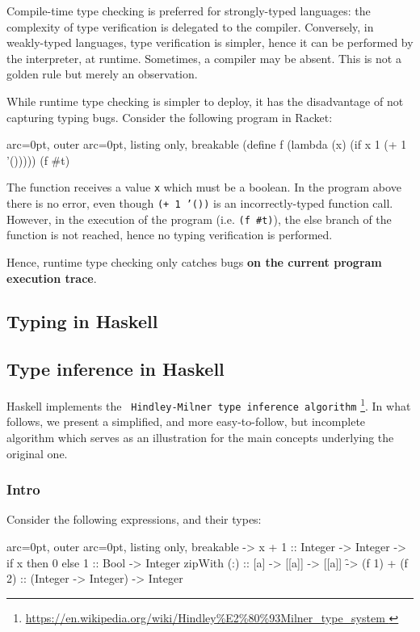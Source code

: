 Compile-time type checking is preferred for strongly-typed languages: the complexity of type verification is delegated to the compiler. Conversely, in weakly-typed languages, type verification is simpler, hence it can be performed by the interpreter, at runtime. Sometimes, a compiler may be absent. This is not a golden rule but merely an observation.

While runtime type checking is simpler to deploy, it has the disadvantage of not capturing typing bugs. Consider the following program in Racket:

\begin{tcblisting}{ arc=0pt, outer arc=0pt, listing only, breakable}
(define f (lambda (x) (if x 1 (+ 1 '()))))
(f #t)

\end{tcblisting}


The function receives a value \texttt{x} which must be a boolean. In the program above there is no error, even though \texttt{(+ 1 '())} is an incorrectly-typed function call. However, in the execution of the program (i.e. \texttt{(f \#t)}), the else branch of the function is not reached, hence no typing verification is performed.

Hence, runtime type checking only catches bugs \textbf{on the current program execution trace}.


\subsection*{ Typing in Haskell }

\subsection*{ Type inference in Haskell }

Haskell implements the \texttt{ Hindley-Milner type inference algorithm} \footnote{\url{https://en.wikipedia.org/wiki/Hindley\%E2\%80\%93Milner\_type\_system }}. In what follows, we present a simplified, and more easy-to-follow, but incomplete algorithm which serves as an illustration for the main concepts underlying the original one. 

\subsubsection*{ Intro }

Consider the following expressions, and their types:

\begin{tcblisting}{ arc=0pt, outer arc=0pt, listing only, breakable}
\x -> x + 1 :: Integer -> Integer
\x -> if x then 0 else 1 :: Bool -> Integer
zipWith (:) :: [a] -> [[a]] -> [[a]]
\f -> (f 1) + (f 2) :: (Integer -> Integer) -> Integer

\end{tcblisting}



